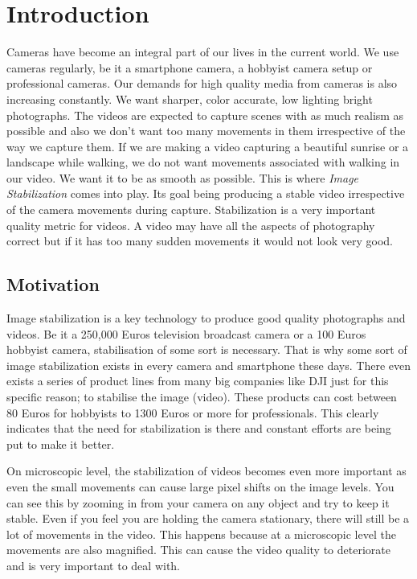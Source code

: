 \chapter{Introduction} \label{chapter_one}

Cameras have become an integral part of our lives in the current world. We use cameras regularly, be it a smartphone camera, a hobbyist camera setup or professional cameras. Our demands for high quality media from cameras is also increasing constantly. We want sharper, color accurate, low lighting bright photographs. The videos are expected to capture scenes with as much realism as possible and also we don't want too many movements in them irrespective of the way we capture them. If we are making a video capturing a beautiful sunrise or a landscape while walking, we do not want movements associated with walking in our video. We want it to be as smooth as possible. This is where \textit{Image Stabilization} comes into play. Its goal being producing a stable video irrespective of the camera movements during capture. Stabilization is a very important quality metric for videos. A video may have all the aspects of photography correct but if it has too many sudden movements it would not look very good.



\section{Motivation}

Image stabilization is a key technology to produce  good quality photographs and videos. Be it a 250,000 Euros television broadcast camera or a 100 Euros hobbyist camera, stabilisation of some sort is necessary. That is why some sort of image stabilization exists in every camera and smartphone these days. There even exists a series of product lines from many big companies like DJI just for this specific reason; to stabilise the image (video). These products can cost between 80 Euros for hobbyists to 1300 Euros or more for professionals. This clearly indicates that the need for stabilization is there and constant efforts are being put to make it better.

On microscopic level, the stabilization of videos becomes even more important as even the small movements can cause large pixel shifts on the image levels. You can see this by zooming in from your camera on any object and try to keep it stable. Even if you feel you are holding the camera stationary, there will still be a lot of movements in the video. This happens because at a microscopic level the movements are also magnified. This can cause the video quality to deteriorate and is very important to deal with. 

